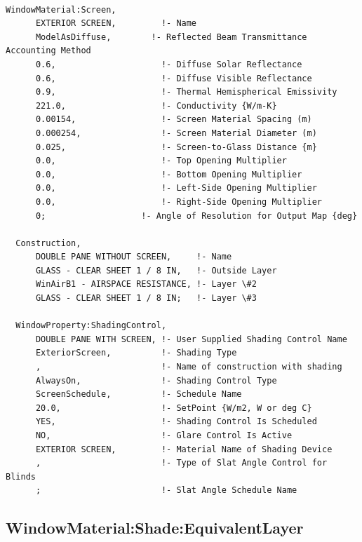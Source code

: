 \begin{lstlisting}

WindowMaterial:Screen,
      EXTERIOR SCREEN,         !- Name
      ModelAsDiffuse,        !- Reflected Beam Transmittance Accounting Method
      0.6,                     !- Diffuse Solar Reflectance
      0.6,                     !- Diffuse Visible Reflectance
      0.9,                     !- Thermal Hemispherical Emissivity
      221.0,                   !- Conductivity {W/m-K}
      0.00154,                 !- Screen Material Spacing (m)
      0.000254,                !- Screen Material Diameter (m)
      0.025,                   !- Screen-to-Glass Distance {m}
      0.0,                     !- Top Opening Multiplier
      0.0,                     !- Bottom Opening Multiplier
      0.0,                     !- Left-Side Opening Multiplier
      0.0,                     !- Right-Side Opening Multiplier
      0;                   !- Angle of Resolution for Output Map {deg}

  Construction,
      DOUBLE PANE WITHOUT SCREEN,     !- Name
      GLASS - CLEAR SHEET 1 / 8 IN,   !- Outside Layer
      WinAirB1 - AIRSPACE RESISTANCE, !- Layer \#2
      GLASS - CLEAR SHEET 1 / 8 IN;   !- Layer \#3

  WindowProperty:ShadingControl,
      DOUBLE PANE WITH SCREEN, !- User Supplied Shading Control Name
      ExteriorScreen,          !- Shading Type
      ,                        !- Name of construction with shading
      AlwaysOn,                !- Shading Control Type
      ScreenSchedule,          !- Schedule Name
      20.0,                    !- SetPoint {W/m2, W or deg C}
      YES,                     !- Shading Control Is Scheduled
      NO,                      !- Glare Control Is Active
      EXTERIOR SCREEN,         !- Material Name of Shading Device
      ,                        !- Type of Slat Angle Control for Blinds
      ;                        !- Slat Angle Schedule Name
\end{lstlisting}

\subsection{WindowMaterial:Shade:EquivalentLayer}\label{windowmaterialshadeequivalentlayer}

